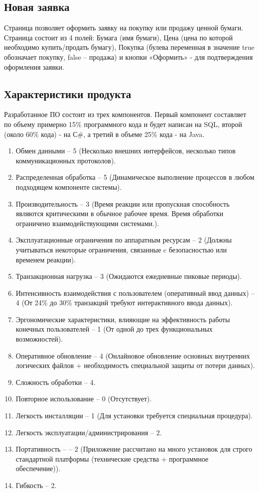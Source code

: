 \subsection*{Новая заявка}
Страница позволяет оформить заявку на покупку или продажу ценной бумаги. 
Страница состоит из 4 полей: Бумага (имя бумаги), Цена (цена по которой необходимо купить/продать бумагу), Покупка (булева переменная в
значение true обозначает покупку, false – продажа) и кнопки «Оформить» - для подтверждения оформления заявки.

\newpage
\subsection*{Характеристики продукта}
Разработанное ПО состоит из трех компонентов. 
Первый компонент составляет по объему примерно 15\% программного кода и будет написан на SQL, второй (около 60\% кода) - на С\#, а третий в объеме 25\% кода - на Java. 

\begin{enumerate}
	\item Обмен данными -- 5 (Несколько внешних интерфейсов, несколько типов коммуникационных протоколов).
	\item Распределенная обработка -- 5 (Динамическое выполнение процессов в любом подходящем компоненте системы).
	\item Производительность -- 3 (Время реакции или пропускная способность являются критическими в обычное рабочее
	время. Время обработки ограничено взаимодействующими системами.).
	\item Эксплуатационные ограничения по аппаратным ресурсам -- 2 (Должны учитываться некоторые ограничения, связанные c безопасностью или временем реакции).
	\item Транзакционная нагрузка -- 3 (Ожидаются ежедневные пиковые периоды).
	\item Интенсивность взаимодействия с пользователем (оперативный ввод данных) -- 4 (От 24\% до 30\% транзакций требуют интерактивного ввода данных).
	\item Эргономические характеристики, влияющие на эффективность работы конечных пользователей -- 1 (От одной до трех функциональных возможностей).
	\item Оперативное обновление -- 4 (Онлайновое обновление основных внутренних логических файлов + необходимость специальной защиты от потери данных).
	\item Сложность обработки -- 4.
	\item Повторное использование -- 0 (Отсутствует).
	\item Легкость инсталляции -- 1 (Для установки требуется специальная процедура).
	\item Легкость эксплуатации/администрирования -- 2.
	\item Портативность -- -- 2 (Приложение рассчитано на много установок для строго стандартной платформы (технические средства + программное обеспечение)).
	\item Гибкость -- 2.
\end{enumerate}

